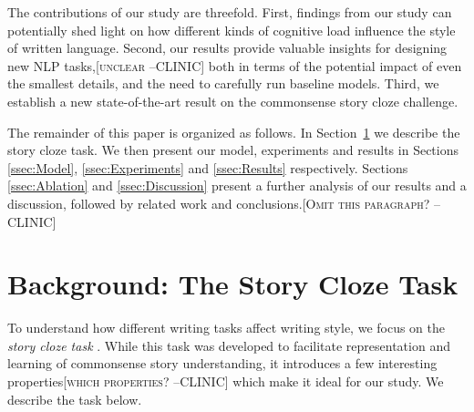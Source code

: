 \documentclass[11pt,a4paper]{article}
\newcommand{\secref}[1]{Section~\ref{ssec:#1}}
\newcommand{\isection}[2]{\section{#1}\label{ssec:#2}}
\newcommand{\com}[1]{}
\newcommand{\clinic}[1]{{\color{magenta}\textsc{[#1 --CLINIC]}}}
\begin{document}
\com{Our results suggest that writing style is affected by the the writer's state of mind.
Writing a sentence intended to be {\it wrong} turns out quite differently than a sentence intended to be {\it right}. 
Similarly, writing a sentence as part of the story is different from reading a story, and then writing the final sentence.}

The contributions of our study are threefold. 
First, findings from our study can potentially shed light on 
how different kinds of cognitive load influence the style of written language. 
Second, our results provide valuable insights for designing new NLP tasks,\clinic{unclear}
both in terms of the potential impact of even the smallest details, and the need to carefully run baseline models.
Third, we establish a new state-of-the-art result on the commonsense story cloze challenge. 


The remainder of this paper is organized as follows. In \secref{ROC_Story} we describe the story cloze task.
We then present our model, experiments and results in Sections \ref{ssec:Model}, \ref{ssec:Experiments} and \ref{ssec:Results} respectively.
Sections \ref{ssec:Ablation} and \ref{ssec:Discussion} present a further analysis of our results  and a discussion, followed by related work and conclusions.\clinic{Omit this paragraph?}

\isection{Background: The Story Cloze Task}{ROC_Story}
To understand how different writing tasks affect writing style, 
we focus on the \textit{story cloze task} \cite{Mostafazadeh:2016}. 
While this task was developed to facilitate representation and learning of commonsense story understanding,
it introduces a few interesting properties\clinic{which properties?} which make it ideal for our study. 
We describe the task below.


\end{document}
